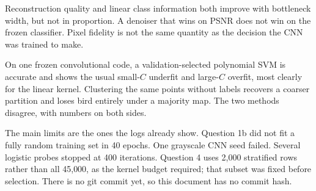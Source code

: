 \documentclass[10pt,twocolumn,letterpaper]{article}
\begin{document}
Reconstruction quality and linear class information both improve with bottleneck width, but not in proportion. A denoiser that wins on PSNR does not win on the frozen classifier. Pixel fidelity is not the same quantity as the decision the CNN was trained to make.

On one frozen convolutional code, a validation-selected polynomial SVM is accurate and shows the usual small-$C$ underfit and large-$C$ overfit, most clearly for the linear kernel. Clustering the same points without labels recovers a coarser partition and loses bird entirely under a majority map. The two methods disagree, with numbers on both sides.

The main limits are the ones the logs already show. Question 1b did not fit a fully random training set in 40 epochs. One grayscale CNN seed failed. Several logistic probes stopped at 400 iterations. Question 4 uses 2{,}000 stratified rows rather than all 45{,}000, as the kernel budget required; that subset was fixed before selection. There is no git commit yet, so this document has no commit hash.

{\small


}
\end{document}

